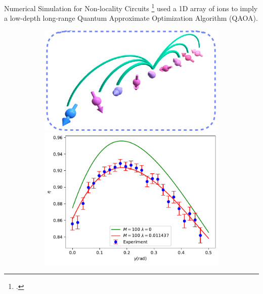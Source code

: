 \documentclass[10pt]{beamer}
\begin{document}
\begin{CJK}{UTF8}{gbsn}
\begin{frame}[fragile]{Numerical Simulation for Non-locality Circuits}
  \cite{pagano2020quantum}\footcite{pagano2020quantum} used a 1D array of ions to imply a low-depth long-range Quantum Approximate Optimization Algorithm (QAOA).
  \begin{figure}
    \centering
    \begin{subfigure}[t]{0.9\textwidth}
    \end{subfigure}
    \vfill
    \begin{subfigure}[t]{\textwidth}
      \begin{minipage}[t]{0.45\textwidth}
        \centering
        \includegraphics[width=\textwidth]{fig/ion2.png}
      \end{minipage}
      \hfill
      \begin{minipage}[t]{0.45\textwidth}
        \centering
        \includegraphics[width=\textwidth]{fig/QAOA.pdf}

\end{minipage}
\end{subfigure}
\end{figure}
\end{frame}
\end{CJK}
\end{document}
